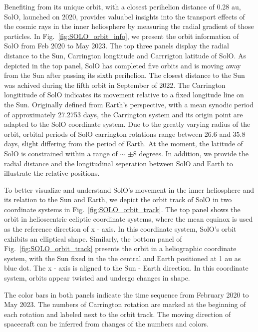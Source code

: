 Benefiting from its unique orbit, with a closest perihelion distance of 0.28 au, \ac{SolO}, launched on 2020, provides valuabel insights into the transport effects of the cosmic rays in the inner heliosphere by measuring the radial gradient of those particles.
In Fig.~\ref{fig:SOLO_orbit_info}, we present the orbit information of \ac{SolO} from Feb 2020 to May 2023. The top three panels display the radial distance to the Sun, Carrington longtitude and Carrrigton latitude of \ac{SolO}. As depicted in the top panel, \ac{SolO} has completed five orbits and is moving away from the Sun after passing its sixth perihelion. The closest distance to the Sun was achived during the fifth orbit in September of 2022. 
The Carrington longititude of \ac{SolO} indicates its movement relative to a fixed longitude line on the Sun. Originally defined from Earth's perspective, with a mean synodic period of approximately 27.2753 days, the Carrington system and its origin point are adapted to the \ac{SolO} coordinate system. 
Due to the greatly varying radius of the orbit, orbital periods of \ac{SolO} carrington rotations range between 26.6 and 35.8 days, slight differing from the period of Earth. At the moment, the latitude of \ac{SolO} is constrained within a range of $\sim$ $\pm$8 degrees.
In addition, we provide the radial distance and the longitudinal seperation between \ac{SolO} and Earth to illustrate the relative positions.

To better visualize and understand \ac{SolO}'s movement in the inner heliosphere and its relation to the Sun and Earth, we depict the orbit track of \ac{SolO} in two coordinate systems in Fig.~\ref{fig:SOLO_orbit_track}. The top panel shows the orbit in helioscentric ecliptic coordinate systems, where the mean equinox is used as the reference direction of x - axis. In this coordinate system, \ac{SolO}'s orbit exhibits an elliptical shape. Similarly, the bottom panel of Fig.~\ref{fig:SOLO_orbit_track} presents the orbit in a heliographic coordinate system, with the Sun fixed in the the central and Earth positioned at 1 au as blue dot. The x - axis is aligned to the Sun - Earth direction. In this coordinate system, orbits appear twisted and undergo changes in shape.

The color bars in both panels indicate the time sequence from February 2020 to May 2023. The numbers of Carrington rotation  are marked at the beginning of each rotation and labeled next to the orbit track. The moving direction of spacecraft can be inferred from changes of the numbers and colors.



